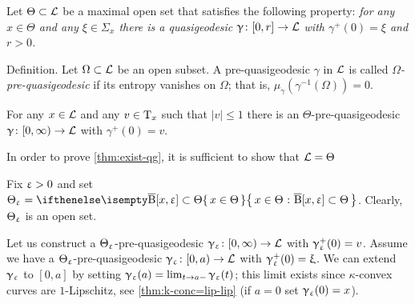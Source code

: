 Let $\Theta\subset \spc{L}$ be a maximal open set that satisfies the following property:
\textit{for any $x\in \Theta$ and any $\xi\in\Sigma_x$ there is a quasigeodesic $\gamma\:[0,r]\to \spc{L}$ with $\gamma^+(0)=\xi$ and $r>0$.}

\begin{clm}{Definition.}
Let $\Omega\subset \spc{L}$ be an open subset. 
A pre-quasigeodesic $\gamma$ in $\mathcal{L}$ is called \emph{$\Omega$-pre-quasigeodesic} if  its
entropy vanishes on $\Omega$; 
that is, $\mu_\gamma(\gamma^{-1}(\Omega))=0$.
\end{clm}

\begin{clm}{}\label{clm:loc-exist} For any $x\in \spc{L}$  and any $v\in \T_x$ such that $|v|\le 1$ there is an $\Theta$-pre-quasigeodesic $\gamma\:[0,\infty)\to \spc{L}$ with $\gamma^+(0)=v$.
\end{clm}

\begin{clm}{}\label{clm:suff-qg-exist} In order to prove \ref{thm:exist-qg}, it is sufficient to show that $\mathcal{L}=\Theta$
\end{clm}

Fix $\upvarepsilon>0$ and set
$\Theta_\eps
=
\set{x\in\Theta}{\cBall[x,\eps]\subset\Theta}$.
Clearly, $\Theta_\upvarepsilon$ is an open set.

Let us construct a $\Theta_\upvarepsilon$-pre-quasigeodesic $\gamma_\eps\:[0,\infty)\to \spc{L}$ with $\upgamma_\upvarepsilon^+(0)=v$.
Assume we have a $\Theta_\upvarepsilon$-pre-quasigeodesic $\gamma_\eps\:[0,a)\to \spc{L}$  with $\upgamma_\upvarepsilon^+(0)=\upxi$.
We can extend $\upgamma_\upvarepsilon$ to $[0,a]$ by setting $\gamma_\eps(a)=\lim_{t\to a-}\gamma_\eps(t)$;
this limit exists since $\kappa$-convex curves are $1$-Lipschitz, see \ref{thm:k-conc=lip-lip}
(if $a=0$ set $\upgamma_\upvarepsilon(0)=x$).

